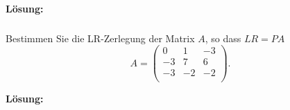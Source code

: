 \noindent \textbf{Lösung:}

\newpage
\subsubsection{} %
Bestimmen Sie die LR-Zerlegung der Matrix $A$, so dass $LR = PA$
\[
A = \begin{pmatrix}
0 & 1 & -3 \\
-3 & 7 & 6 \\
-3 & -2 & -2 \\
\end{pmatrix}.
\]

\textbf{Lösung:}